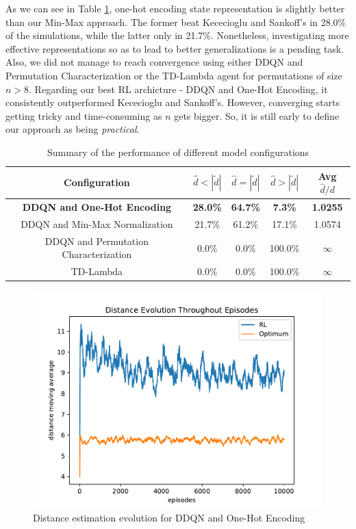 \documentclass[11pt,twoside]{article}
\begin{document}
As we can see in Table \ref{table:results}, one-hot encoding state representation is slightly better than our Min-Max approach. The former beat Kececioglu and Sankoff's in 28.0\% of the simulations, while the latter only in 21.7\%. Nonetheless, investigating more effective representations so as to lead to better generalizations is a pending task. Also, we did not manage to reach convergence using either DDQN and Permutation Characterization or the TD-Lambda agent for permutations of size $n > 8$. Regarding our best RL archicture - DDQN and One-Hot Encoding, it consistently outperformed Kececioglu and Sankoff's. However, converging starts getting tricky and time-consuming as $n$ gets bigger. So, it is still early to define our approach as being \textit{practical}.

\begin{table}[H]
	\begin{center}
		\begin{tabular}{|c|c|c|c|c|}
			\hline
			Configuration & $\hat{d} < |\widetilde{d}|$ & $\hat{d} = |\widetilde{d}|$ & $\hat{d} > |\widetilde{d}|$ & Avg $\hat{d}/d$\\
			\hline\hline
			\textbf{DDQN and One-Hot Encoding} & \textbf{28.0\%} & \textbf{64.7\%} & \textbf{7.3\%} & \textbf{1.0255}\\
			DDQN and Min-Max Normalization & 21.7\% & 61.2\% & 17.1\% & 1.0574\\
			DDQN and Permutation Characterization & 0.0\% & 0.0\% & 100.0\% & $\infty$\\
			TD-Lambda & 0.0\% & 0.0\% & 100.0\% & $\infty$\\
			\hline
		\end{tabular}
		\caption{Summary of the performance of different model configurations}
	\label{table:results}
	\end{center}
\end{table}


\begin{figure}[H]
	\begin{center}
		\includegraphics[scale=0.8]{charts/dist_evolution.pdf}
		\caption{Distance estimation evolution for DDQN and One-Hot Encoding}
		\label{chart:dist_evolution}
	\end{center}
\end{figure}
\end{document}
